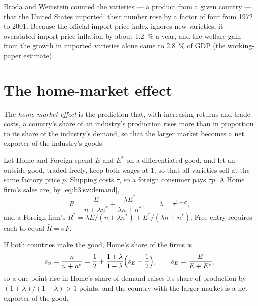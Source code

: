 \begin{record}
Broda and Weinstein counted the varieties --- a product from a given country ---
that the United States imported: their number rose by a factor of four from 1972
to 2001. Because the official import price index ignores new varieties, it
overstated import price inflation by about 1.2~\% a year, and the welfare gain
from the growth in imported varieties alone came to 2.8~\% of GDP (the working-paper
estimate). %
\end{record}

\section{The home-market effect}\label{sec:b3:scale-variety-firms:home-market}

\begin{definition}\label{def:b3:scale-variety-firms:home-market}
The \emph{home-market effect} is the prediction that, with increasing returns and
trade costs, a country's share of an industry's production rises more than in
proportion to its share of the industry's demand, so that the larger market
becomes a net exporter of the industry's goods.
\end{definition}

Let Home and Foreign spend $E$ and $E^*$ on a differentiated good, and let an
outside good, traded freely, keep both wages at 1, so that all varieties sell at
the same factory price $p$. Shipping costs $\tau$, so a foreign consumer pays $\tau
p$. A Home firm's sales are, by \eqref{eq:b3:sv:demand},
\[
  R = \frac{E}{n + \lambda n^*} + \frac{\lambda E^*}{\lambda n + n^*}, \qquad \lambda = \tau^{1-\sigma},
\]
and a Foreign firm's $R^* = \lambda E/(n + \lambda n^*) + E^*/(\lambda n + n^*)$. Free entry
requires each to equal $\bar R = \sigma F$.

\begin{proposition}\label{prop:b3:scale-variety-firms:hme}
If both countries make the good, Home's share of the firms is
\[
  s_n = \frac{n}{n + n^*} = \frac12 + \frac{1 + \lambda}{1 - \lambda}\Bigl(s_E - \frac12\Bigr),
  \qquad s_E = \frac{E}{E + E^*},
\]
so a one-point rise in Home's share of demand raises its share of production by
$(1 + \lambda)/(1 - \lambda) > 1$ points, and the country with the larger market is a net
exporter of the good.
\end{proposition}

